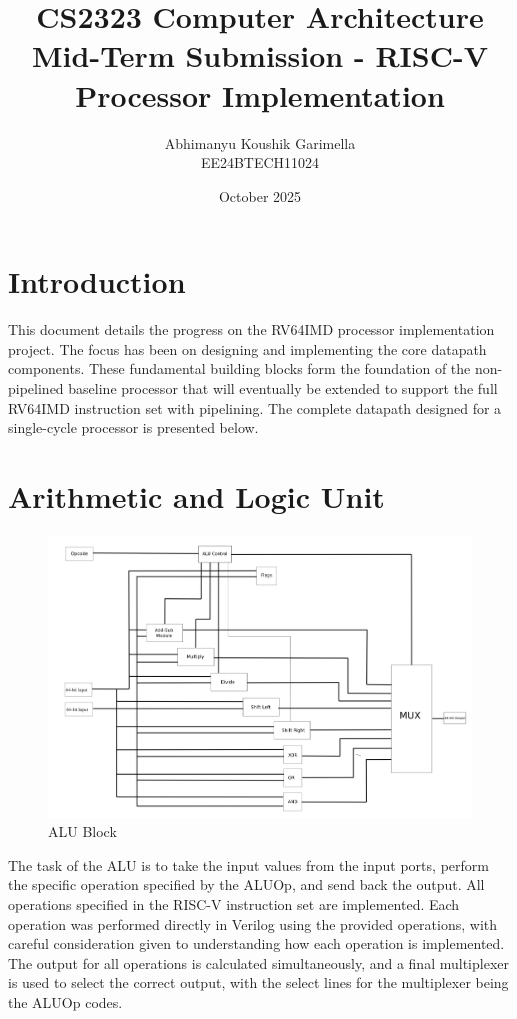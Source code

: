 \documentclass{article}
\title{CS2323 Computer Architecture\\Mid-Term Submission - RISC-V Processor Implementation}
\author{Abhimanyu Koushik Garimella\\EE24BTECH11024}
\date{October 2025}
\begin{document}
\maketitle

\section*{Introduction}

This document details the progress on the RV64IMD processor implementation project. The focus has been on designing and implementing the core datapath components. These fundamental building blocks form the foundation of the non-pipelined baseline processor that will eventually be extended to support the full RV64IMD instruction set with pipelining. The complete datapath designed for a single-cycle processor is presented below.

\section*{Arithmetic and Logic Unit}

\begin{figure}[H]
    \centering
    \includegraphics[width=\linewidth]{ALU.png}
    \caption{ALU Block}
    \label{fig:alu}
\end{figure}

The task of the ALU is to take the input values from the input ports, perform the specific operation specified by the ALUOp, and send back the output. All operations specified in the RISC-V instruction set are implemented. Each operation was performed directly in Verilog using the provided operations, with careful consideration given to understanding how each operation is implemented. The output for all operations is calculated simultaneously, and a final multiplexer is used to select the correct output, with the select lines for the multiplexer being the ALUOp codes.
\end{document}

